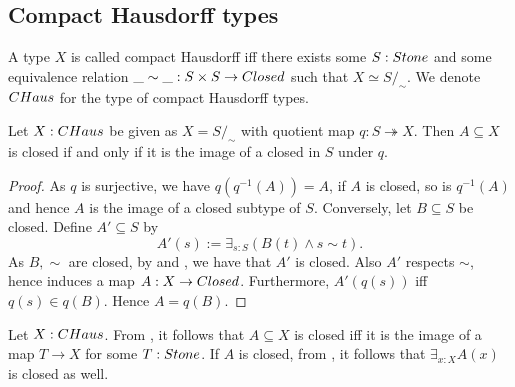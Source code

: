\subsection{Compact Hausdorff types}


\begin{definition}
  A type $X$ is called compact Hausdorff iff there exists some $S:\Stone$ and some 
  equivalence relation $\_\sim\_ : S\times S \to \Closed$ such that $X \simeq S /_\sim$. 
  We denote $\CHaus$ for the type of compact Hausdorff types. 
\end{definition} 

\begin{lemma}\label{CompactHausdorffClosed}
  Let $X:\CHaus$ be given as $X=S/_\sim$ with quotient map $q:S\twoheadrightarrow X$.
  Then $A\subseteq X$ is closed if and only if it is the image of a closed in $S$ under $q$. 
\end{lemma}
\begin{proof}
  As $q$ is surjective, we have $q(q^{-1}(A)) = A$,
  if $A$ is closed, so is $q^{-1}(A)$ and 
  hence $A$ is the image of a closed subtype of $S$. 
  Conversely, let $B\subseteq S$ be closed. 
  Define $A'\subseteq S$ by 
  $$A'(s) := \exists_{s:S} (B(t) \wedge s \sim t).$$
  As $B, \sim$ are closed, by  and , 
  we have that $A'$  is closed. 
  Also $A'$ respects $\sim$, hence induces a map $A: X\to \Closed$.
  Furthermore, $A'(q(s))$ iff $q(s)\in q(B)$. 
  Hence $A=q(B)$. 
\end{proof}
\begin{remark}\label{InhabitedClosedSubSpaceClosedCHaus}
  Let $X:\Chaus$.
  From , it follows that $A\subseteq X$ is closed iff it is the image of a map 
  $T\to X$ for some $T:\Stone$. 
  If $A$ is closed, from , it follows that $\exists_{x:X} A(x)$ is closed as well. 
\end{remark}
